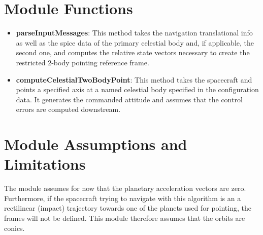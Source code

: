 

\section{Module Functions}
\begin{itemize}
	\item \textbf{parseInputMessages}: This method takes the navigation translational info as well as the spice data of the primary celestial body and, if applicable, the second one, and computes the relative state vectors necessary to create the restricted 2-body pointing reference frame.
	\item \textbf{computeCelestialTwoBodyPoint}: This method takes the spacecraft and points a specified axis at a named
 celestial body specified in the configuration data.  It generates the commanded attitude and assumes that the control errors are computed downstream.	
 \end{itemize}

\section{Module Assumptions and Limitations}

The module assumes for now that the planetary acceleration vectors are zero.
Furthermore, if the spacecraft trying to navigate with this algorithm is an a rectilinear (impact) trajectory towards one of the planets used for pointing, the frames will not be defined. This module therefore assumes that the orbits are conics.  